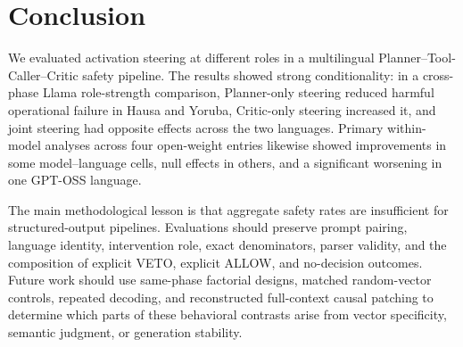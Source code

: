 \section{Conclusion}
We evaluated activation steering at different roles in a multilingual Planner--Tool-Caller--Critic safety pipeline. The results showed strong conditionality: in a cross-phase Llama role-strength comparison, Planner-only steering reduced harmful operational failure in Hausa and Yoruba, Critic-only steering increased it, and joint steering had opposite effects across the two languages. Primary within-model analyses across four open-weight entries likewise showed improvements in some model--language cells, null effects in others, and a significant worsening in one GPT-OSS language.

The main methodological lesson is that aggregate safety rates are insufficient for structured-output pipelines. Evaluations should preserve prompt pairing, language identity, intervention role, exact denominators, parser validity, and the composition of explicit VETO, explicit ALLOW, and no-decision outcomes. Future work should use same-phase factorial designs, matched random-vector controls, repeated decoding, and reconstructed full-context causal patching to determine which parts of these behavioral contrasts arise from vector specificity, semantic judgment, or generation stability.